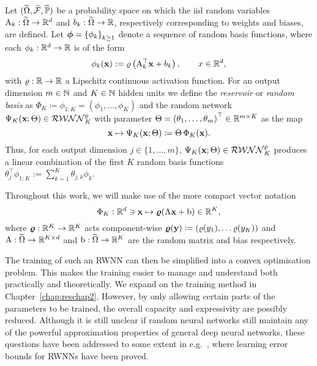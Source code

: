 \begin{definition}\label{def:RWNN}
Let $(\widetilde{\Omega}, \widetilde{\mathcal{F}}, \widetilde{\mathbb{P}})$ be a probability space on which the iid random variables $\mathrm{A}_{k}: \widetilde{\Omega} \rightarrow \mathbb{R}^{d}$ and $b_{k}: \widetilde{\Omega} \rightarrow \mathbb{R}$, respectively corresponding to weights and biases, are defined. Let $\boldsymbol{\phi}=\left\{\phi_{k}\right\}_{k \geq 1}$ denote a sequence of random basis functions, where each $\phi_{k}: \mathbb{R}^{d} \to\mathbb{R}$ is of the form
$$
\phi_{k}(\boldsymbol{\mathrm{x}}):=\varrho\left(\mathrm{A}_{k}^{\top} \boldsymbol{\mathrm{x}} + b_{k}\right), \qquad x\in\mathbb{R}^d,
$$
with $\varrho:\mathbb{R}\rightarrow\mathbb{R}$ a Lipschitz continuous activation function. 
For an output dimension $m\in\mathbb{N}$ and $K \in \mathbb{N}$ hidden units we define the \textit{reservoir} or \textit{random basis} as $\Phi_{K}\coloneqq\phi_{1:K}=(\phi_1,\dots,\phi_K)$ and the random network $\Psi_K(\boldsymbol{\mathrm{x}};\Theta)\in\mathcal{RWNN}^\varrho_K$ with parameter $\Theta=\left(\theta_{1}, \ldots, \theta_{m}\right)^\top \in \mathbb{R}^{m\times K}$ as the map %
\[
\boldsymbol{\mathrm{x}} \mapsto \Psi_K(\boldsymbol{\mathrm{x}};\Theta)\coloneqq\Theta\,\Phi_K(\boldsymbol{\mathrm{x}}).
\]
Thus, for each output dimension $j\in\{1,\dots,m\}$, $\Psi_K(\boldsymbol{\mathrm{x}};\Theta)\in\mathcal{RWNN}^\varrho_K$ produces a linear combination of the first $K$ random basis functions $\theta_j^\top\phi_{1:K}:=\sum_{k=1}^{K} \theta_{j,k} \phi_{k}$.
\end{definition}

\begin{remark}
Throughout this work, we will make use of the more compact vector notation
$$
\Phi_K: \mathbb{R}^d \ni \boldsymbol{\mathrm{x}}\mapsto \boldsymbol\varrho(\mathrm{A} \mathbf{x}+\mathrm{b}) \in \mathbb{R}^{K},
$$
where $\boldsymbol\varrho:\mathbb{R}^K\rightarrow\mathbb{R}^K$ acts component-wise $\boldsymbol\varrho(\boldsymbol{\mathrm{y}})\coloneqq(\varrho(y_1), \dots \varrho(y_K))$ and $\mathrm{A}: \widetilde{\Omega} \rightarrow \mathbb{R}^{K\times d}$ and $\mathrm{b}: \widetilde{\Omega} \rightarrow \mathbb{R}^K$ are the random matrix and bias respectively.
\end{remark}

The training of such an RWNN can then be simplified into a convex optimisation problem. This makes the training easier to manage and understand both practically and theoretically. We expand on the training method in Chapter~\ref{chap:reschap2}. However, by only allowing certain parts of the parameters to be trained, the overall capacity and expressivity are possibly reduced. Although it is still unclear if random neural networks still maintain any of the powerful approximation properties of general deep neural networks, these questions have been addressed to some extent in e.g.~\cite{Gonon2020ApproximationSystems, Mei2022GeneralizationConcentration}, where learning error bounds for RWNNs have been proved.

